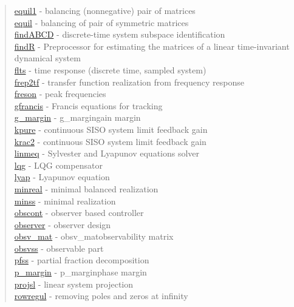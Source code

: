 \begin{quote}
\hyperlink{equil1}{equil1} - {balancing (nonnegative) pair of matrices} \\  
\hyperlink{equil}{equil} - {balancing of pair of symmetric matrices} \\  
\hyperlink{findABCD}{findABCD} - {discrete-time system subspace identification} \\  
\hyperlink{findR}{findR} - {Preprocessor for estimating the matrices of a linear time-invariant dynamical system} \\  
\hyperlink{flts}{flts} - {time response (discrete time, sampled system)  } \\  
\hyperlink{frep2tf}{frep2tf} - {transfer function realization from frequency response} \\  
\hyperlink{freson}{freson} - {peak frequencies} \\  
\hyperlink{gfrancis}{gfrancis} - {Francis equations for tracking} \\  
\hyperlink{g_margin}{g\_margin} - {g_margin}{gain margin} \\  
\hyperlink{kpure}{kpure} - {continuous SISO system limit feedback gain} \\  
\hyperlink{krac2}{krac2} - {continuous SISO system limit feedback gain} \\  
\hyperlink{linmeq}{linmeq} - {Sylvester and Lyapunov equations solver} \\  
\hyperlink{lqg}{lqg} - {LQG compensator} \\  
\hyperlink{lyap}{lyap} - {Lyapunov equation} \\  
\hyperlink{minreal}{minreal} - {minimal balanced realization} \\  
\hyperlink{minss}{minss} - {minimal realization} \\  
\hyperlink{obscont}{obscont} - {observer based controller} \\  
\hyperlink{observer}{observer} - {observer design} \\  
\hyperlink{obsv_mat}{obsv\_mat} - {obsv_mat}{observability matrix} \\  
\hyperlink{obsvss}{obsvss} - {observable part} \\  
\hyperlink{pfss}{pfss} - {partial fraction decomposition} \\  
\hyperlink{p_margin}{p\_margin} - {p_margin}{phase margin} \\  
\hyperlink{projsl}{projsl} - {linear system projection} \\  
\hyperlink{rowregul}{rowregul} - {removing poles and zeros at infinity} \\  

\end{quote}
